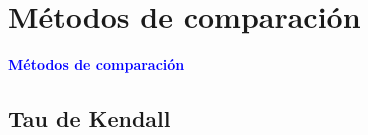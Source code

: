 \documentclass[10pt,hyperref={unicode}]{beamer}
\begin{document}
			
	
			
			
			
			
	
	\section{Métodos de comparación}
	
	\begin{frame}
		\begin{center}
			\Huge\textbf{\textsf{\textcolor{blue}{Métodos de comparación}}}
		\end{center}
	\end{frame}
	
	\subsection*{Tau de Kendall}
	
	
\end{document}
